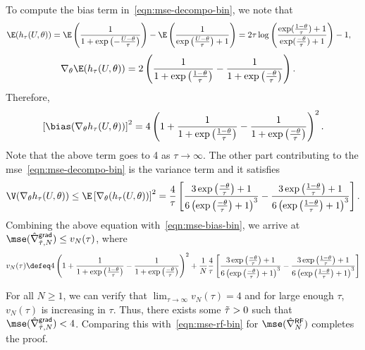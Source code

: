 To compute the bias term in~\eqref{eqn:mse-decompo-bin}, we note that
\begin{align*}
\E(h_{\tau}(U,\theta)) & = \E \left(\frac{1}{1+\exp\left( -\frac{U-\theta}{\tau}\right)}\right) - \E\left(\frac{1}{\exp\left(\frac{U-\theta}{\tau}\right)+1} \right) =2 \tau \log \left( \frac{\exp (\frac{1-\theta}{\tau})+1}{\exp (\frac{-\theta}{\tau})+1}\right)-1, \end{align*}
\begin{align*}
\nabla_\theta \E(h_{\tau}(U,\theta)) & = 2 \left(\frac{1}{1+\exp\left(\frac{1-\theta}{\tau} \right)} - \frac{1}{1+\exp\left(\frac{-\theta}{\tau} \right)}\right).
\end{align*} 
Therefore,
\begin{align}
\left[\bias(\nabla_\theta h_{\tau}(U,\theta))\right]^2 = 4 \left(1+\frac{1}{1+\exp\left(\frac{1-\theta}{\tau} \right)} - \frac{1}{1+\exp\left(\frac{-\theta}{\tau} \right)}\right)^2.
\label{eqn:mse-bias-bin}
\end{align}
Note that the above term goes to 4 as $\tau \to \infty$. The other part contributing to the mse~\eqref{eqn:mse-decompo-bin} is  the variance term and it satisfies
\begin{align*}
\V(\nabla_\theta h_{\tau}(U,\theta)) \le 
\E\left[\nabla_\theta (h_{\tau}(U,\theta))\right]^2 =
\frac{4}{\tau} \left[ \frac{3 \exp\left(\frac{-\theta}{\tau}\right) +1}{6 \left(\exp\left(\frac{-\theta}{\tau}\right)+1\right)^3 } - \frac{3 \exp\left(\frac{1-\theta}{\tau}\right) +1}{6 \left(\exp\left(\frac{1-\theta}{\tau}\right)+1\right)^3 }  \right].
\end{align*}
Combining the above equation with~\eqref{eqn:mse-bias-bin},
we arrive at $\mse(\hat{\nabla}^{\mathsf{grad}}_{\tilde{\tau},N}) 
\le 
v_N(\tau)$, where
\begin{align*}
v_N(\tau) \defeq 
4
\left(1+\frac{1}{1+\exp\left(\frac{1-\theta}{\tau} \right)} - \frac{1}{1+\exp\left(\frac{-\theta}{\tau} \right)}\right)^2 + \frac{1}{N}
\frac{4}{\tau} \left[ \frac{3 \exp\left(\frac{-\theta}{\tau}\right) +1}{6 \left(\exp\left(\frac{-\theta}{\tau}\right)+1\right)^3 } - \frac{3 \exp\left(\frac{1-\theta}{\tau}\right) +1}{6 \left(\exp\left(\frac{1-\theta}{\tau}\right)+1\right)^3 }  \right]
\end{align*}

 

For all $N \ge 1$, 
we can verify that $\lim_{\tau \to \infty} v_N(\tau) = 4$
and for large enough $\tau$, $v_N(\tau)$ is increasing in $\tau$. Thus, there exists some 
$\Tilde{\tau} > 0$ such that $\mse(\hat{\nabla}^{\mathsf{grad}}_{\tilde{\tau},N}) < 4$.
Comparing this with~\eqref{eqn:mse-rf-bin} for $\mse(\hat{\nabla}^{\mathsf{RF}}_{N}) $  completes the proof.
 

